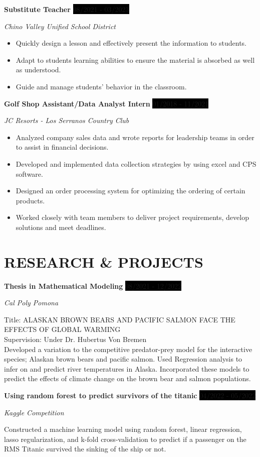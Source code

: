 \documentclass[paper=a4,fontsize=10pt]{scrartcl} %
\newcommand{\sepspace}{\vspace*{1em}}		%
\newcommand{\NewPart}[1]{\section*{\uppercase{#1}}}
\newcommand{\EducationEntry}[4]{
		\noindent \textbf{#1} \hfill      %
		\colorbox{Black}{%
			\parbox{5em}{%
			\hfill\color{White}#2}} \par  %
		\noindent \textit{#3} \par        %
		\noindent\hangindent=2em\hangafter=0 \small #4 %
		\normalsize \par}
\newcommand{\WorkEntry}[4]{				  %
		\noindent \textbf{#1} \hfill      %
		\colorbox{Black}{\color{White}#2} \par  %
		\noindent \textit{#3} \par              %
		\noindent \small #4 %
		\normalsize}
\begin{document}
\sepspace

\WorkEntry{Substitute Teacher}
{08/2021 - 03/2023}
{Chino Valley Unified School District}
{\begin{itemize}[leftmargin=*]
    \item Quickly design a lesson and effectively present the information to students.
    \item Adapt to students learning abilities to ensure the material is absorbed as well as understood.
    \item Guide and manage students' behavior in the classroom.
\end{itemize}}

\sepspace

\WorkEntry{Golf Shop Assistant/Data Analyst Intern}
{01/2018 - 11/2021}
{JC Resorts - Los Serranos Country Club}
{\begin{itemize}[leftmargin=*]
    \item Analyzed company sales data and wrote reports for leadership teams in order to assist in financial decisions.
    \item Developed and implemented data collection strategies by using excel and CPS software.
    \item Designed an order processing system for optimizing the ordering of certain products.
    \item Worked closely with team members to deliver project requirements, develop solutions and meet deadlines.
\end{itemize}}

\NewPart{Research \& Projects}{}

\WorkEntry{Thesis in Mathematical Modeling}
{08/2021 - 12/2022}
{Cal Poly Pomona}
{Title: ALASKAN BROWN BEARS AND PACIFIC SALMON FACE THE EFFECTS OF GLOBAL WARMING\\
Supervision: Under Dr. Hubertus Von Bremen\\
 Developed a variation to the competitive predator-prey model for the interactive species; Alaskan brown bears and pacific salmon. 
 Used Regression analysis to infer on and predict river temperatures in Alaska. 
 Incorporated these models to predict the effects of climate change on the brown bear and salmon populations.
}

\sepspace

\WorkEntry{Using random forest to predict survivors of the titanic}
{04/2022 - 05/2022}
{Kaggle Competition}
{Constructed a machine learning model using random forest, linear regression, lasso regularization, and k-fold cross-validation to predict if a passenger on the RMS Titanic survived the sinking of the ship or not.}
\end{document}
